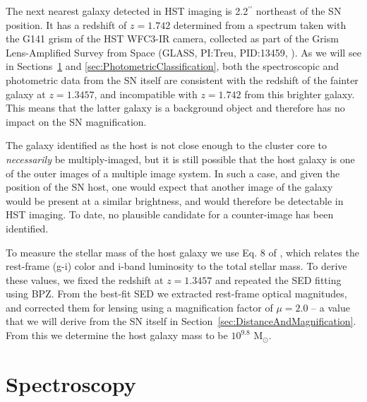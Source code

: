 \documentclass[iop]{emulateapj}
\def\arcsec{\ensuremath{^{\prime\prime}}}
\def\Msun{\mbox{M$_{\odot}$}}
\begin{document}
The next nearest galaxy detected in HST imaging is 2.2\arcsec
northeast of the SN position. It has a redshift of $z=1.742$
determined from a spectrum taken with the G141 grism of the HST
WFC3-IR camera, collected as part of the Grism Lens-Amplified Survey
from Space (GLASS, PI:Treu, PID:13459, \citealt{Treu:2015,Schmidt:2014}).  As we
will see in Sections~\ref{sec:Spectroscopy}
and \ref{sec:PhotometricClassification}, both the spectroscopic and
photometric data from the SN itself are consistent with the
redshift of the fainter galaxy at $z=1.3457$, and
incompatible with $z=1.742$ from this brighter galaxy.  This means
that the latter galaxy is a background object and therefore has no
impact on the SN magnification.

The galaxy identified as the host is not close enough to the cluster
core to {\it necessarily} be multiply-imaged, but it is still possible
that the host galaxy is one of the outer images of a multiple image
system.  In such a case, and given the position of the SN host, one
would expect that another image of the galaxy would be present at a
similar brightness, and would therefore be detectable in HST
imaging. To date, no plausible candidate for a counter-image has been
identified.


To measure the stellar mass of the host galaxy
we use Eq. 8 of \citet{Taylor:2011}, which relates the rest-frame
(g-i) color and i-band luminosity to the total stellar mass. To derive
these values, we fixed the redshift at $z=1.3457$ and repeated the SED
fitting using BPZ. From the best-fit SED we extracted rest-frame
optical magnitudes, and corrected them for lensing using a
magnification factor of $\mu=2.0$ -- a value that we will derive from
the SN itself in Section~\ref{sec:DistanceAndMagnification}.  From
this we determine the host galaxy mass to be $10^{9.8}$ \Msun.


\section{Spectroscopy}
\label{sec:Spectroscopy}
\end{document}
